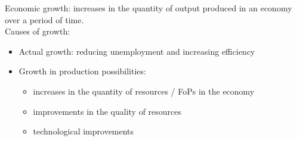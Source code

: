 \documentclass[a4paper,12pt]{article}
\begin{document}
Economic growth: increases in the quantity of output produced in an economy over a period of time.\\
Causes of growth: 
\begin{itemize}
  \item Actual growth: reducing unemployment and increasing efficiency
  \item Growth in production possibilities:
  \begin{itemize}
    \item increases in the quantity of resources / FoPs in the economy
    \item improvements in the quality of resources
    \item technological improvements
  \end{itemize}
\end{itemize}
\end{document}
